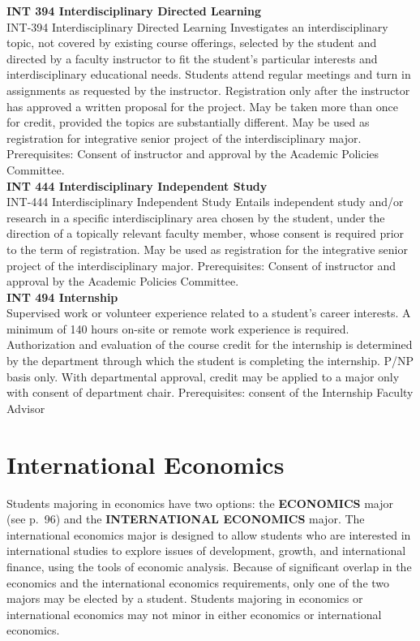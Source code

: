 \documentclass[
  letterpaper,
]{scrbook}
\begin{document}
\textbf{INT 394 Interdisciplinary Directed Learning}\\
INT-394 Interdisciplinary Directed Learning Investigates an
interdisciplinary topic, not covered by existing course offerings,
selected by the student and directed by a faculty instructor to fit the
student's particular interests and interdisciplinary educational needs.
Students attend regular meetings and turn in assignments as requested by
the instructor. Registration only after the instructor has approved a
written proposal for the project. May be taken more than once for
credit, provided the topics are substantially different. May be used as
registration for integrative senior project of the interdisciplinary
major. Prerequisites: Consent of instructor and approval by the Academic
Policies Committee.\\
\textbf{INT 444 Interdisciplinary Independent Study}\\
INT-444 Interdisciplinary Independent Study Entails independent study
and/or research in a specific interdisciplinary area chosen by the
student, under the direction of a topically relevant faculty member,
whose consent is required prior to the term of registration. May be used
as registration for the integrative senior project of the
interdisciplinary major. Prerequisites: Consent of instructor and
approval by the Academic Policies Committee.\\
\textbf{INT 494 Internship}\\
Supervised work or volunteer experience related to a student's career
interests. A minimum of 140 hours on-site or remote work experience is
required. Authorization and evaluation of the course credit for the
internship is determined by the department through which the student is
completing the internship. P/NP basis only. With departmental approval,
credit may be applied to a major only with consent of department chair.
Prerequisites: consent of the Internship Faculty Advisor

\section{International Economics}\label{international-economics}

Students majoring in economics have two options: the \textbf{ECONOMICS}
major (see p.~96) and the \textbf{INTERNATIONAL ECONOMICS} major. The
international economics major is designed to allow students who are
interested in international studies to explore issues of development,
growth, and international finance, using the tools of economic analysis.
Because of significant overlap in the economics and the international
economics requirements, only one of the two majors may be elected by a
student. Students majoring in economics or international economics may
not minor in either economics or international economics.
\end{document}

